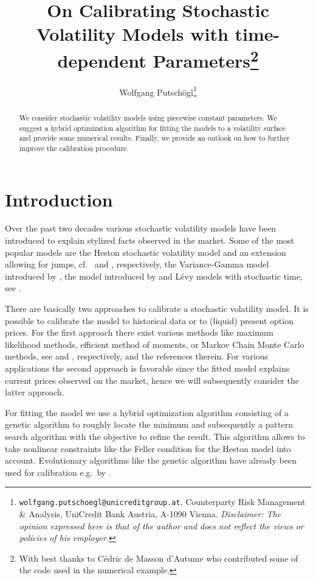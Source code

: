 \documentclass[10pt,a4paper]{article}
\title{On Calibrating Stochastic Volatility Models with time-dependent Parameters\footnote{With best thanks to C\'{e}dric de Masson d'Autume who contributed some of the code used in the numerical example.}}
\author{Wolfgang Putsch\"ogl\footnote{\texttt{wolfgang.putschoegl@unicreditgroup.at}, Counterparty Risk Management \& Analysis, UniCredit Bank Austria, A-1090 Vienna.
\newline 
\textit{Disclaimer: The opinion expressed here is that of the author and does not reflect the views or policies of his
employer.} }}
\numberwithin{equation}{section} %
\theoremstyle{plain}
\theoremstyle{definition}
\theoremstyle{remark}
\begin{document}
\typeout{#####################################}



\maketitle

\begin{abstract}
We consider stochastic volatility models using piecewise constant parameters. We suggest a hybrid optimization algorithm for fitting the models to a volatility surface and provide some numerical results. Finally, we provide an outlook on how to further improve the calibration procedure.
\end{abstract}


\section{Introduction}

Over the past two decades various stochastic volatility models have been introduced to explain stylized facts observed in the market. 
Some of the most popular models are the Heston stochastic volatility model and an extension allowing for jumps, cf.\ 
\cite{He93} and \cite{Ba96}, respectively, the Variance-Gamma model introduced by \cite{MCC98}, the model introduced by \cite{BNS01} and L\'{e}vy models with stochastic time, see \cite{CGHD03}.
 
There are basically two approaches to calibrate a stochastic volatility model. It is possible to calibrate the model to historical data or to (liquid) present option prices. For the first approach there exist various methods like maximum likelihood methods, efficient method of moments, or Markov Chain Monte Carlo methods, see \cite{AK06,GT96} and \cite{FS07}, respectively, and the references therein. For various applications the second approach is favorable since the fitted model explains current prices observed on the market, hence we will subsequently consider the latter approach. 

For fitting the model we use a hybrid optimization algorithm consisting of a genetic algorithm to roughly locate the minimum and subsequently a pattern search algorithm with the objective to refine the result. This algorithm allows to take nonlinear constraints like the Feller condition for the Heston model into account. 
Evolutionary algorithms like the genetic algorithm have already been used for calibration e.g.\ by \cite{HC05}. 
\end{document}
